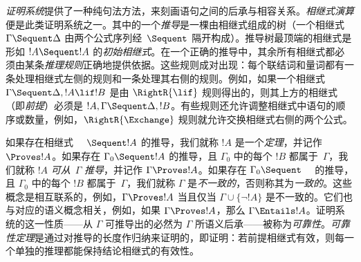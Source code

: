 \emph{证明系统}提供了一种纯句法方法，来刻画语句之间的后承与相容关系。\emph{相继式演算}便是此类证明系统之一。其中的一个\emph{推导}是一棵由相继式组成的树（一个相继式 $\Gamma \Sequent \Delta$ 由两个公式序列经~$\Sequent$ 隔开构成）。推导树最顶端的相继式是形如 $!A \Sequent !A$ 的\emph{初始相继式}。在一个正确的推导中，其余所有相继式都必须由某条\emph{推理规则}正确地提供依据。这些规则成对出现：每个联结词和量词都有一条处理相继式左侧的规则和一条处理其右侧的规则。例如，如果一个相继式 $\Gamma \Sequent \Delta, !A \lif !B$ 是由 $\RightR{\lif}$ 规则得出的，则其上方的相继式（即\emph{前提}）必须是 $!A, \Gamma \Sequent \Delta, !B$。有些规则还允许调整相继式中语句的顺序或数量，例如，$\RightR{\Exchange}$ 规则就允许交换相继式右侧的两个公式。

如果存在相继式 $\quad \Sequent !A$ 的推导，我们就称 $!A$ 是一个\emph{定理}，并记作~$\Proves !A$。如果存在 $\Gamma_0 \Sequent !A$ 的推导，且 $\Gamma_0$ 中的每个 $!B$ 都属于~$\Gamma$，我们就称 $!A$ \emph{可从}~$\Gamma$ \emph{推导}，并记作 $\Gamma \Proves !A$。如果存在 $\Gamma_0 \Sequent \quad$ 的推导，且 $\Gamma_0$ 中的每个 $!B$ 都属于~$\Gamma$，我们就称 $\Gamma$ 是\emph{不一致的}，否则称其为\emph{一致的}。这些概念是相互联系的，例如，$\Gamma \Proves !A$ 当且仅当 $\Gamma \cup \{\lnot !A\}$ 是不一致的。它们也与对应的语义概念相关，例如，如果 $\Gamma \Proves !A$，那么 $\Gamma \Entails !A$。证明系统的这一性质——从 $\Gamma$ 可推导出的必然为 $\Gamma$ 所语义后承——被称为\emph{可靠性}。\emph{可靠性定理}是通过对推导的长度作归纳来证明的，即证明：若前提相继式有效，则每一个单独的推理都能保持结论相继式的有效性。